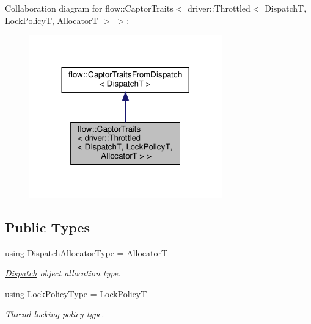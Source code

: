 Collaboration diagram for flow\+:\+:Captor\+Traits$<$ driver\+:\+:Throttled$<$ DispatchT, Lock\+PolicyT, AllocatorT $>$ $>$\+:\nopagebreak
\begin{figure}[H]
\begin{center}
\leavevmode
\includegraphics[width=236pt]{structflow_1_1_captor_traits_3_01driver_1_1_throttled_3_01_dispatch_t_00_01_lock_policy_t_00_01_7745efc83cc27493d3a1201a90d33e8a}
\end{center}
\end{figure}
\subsection*{Public Types}
\begin{DoxyCompactItemize}
\item 
\mbox{\label{structflow_1_1_captor_traits_3_01driver_1_1_throttled_3_01_dispatch_t_00_01_lock_policy_t_00_01_allocator_t_01_4_01_4_a8c02d0a99c8c592f1fbad42a32d3f508}} 
using \hyperlink{structflow_1_1_captor_traits_3_01driver_1_1_throttled_3_01_dispatch_t_00_01_lock_policy_t_00_01_allocator_t_01_4_01_4_a8c02d0a99c8c592f1fbad42a32d3f508}{Dispatch\+Allocator\+Type} = AllocatorT
\begin{DoxyCompactList}\small\item\em \hyperlink{classflow_1_1_dispatch}{Dispatch} object allocation type. \end{DoxyCompactList}\item 
\mbox{\label{structflow_1_1_captor_traits_3_01driver_1_1_throttled_3_01_dispatch_t_00_01_lock_policy_t_00_01_allocator_t_01_4_01_4_aa884050e0d74e3069989fdd06198cd62}} 
using \hyperlink{structflow_1_1_captor_traits_3_01driver_1_1_throttled_3_01_dispatch_t_00_01_lock_policy_t_00_01_allocator_t_01_4_01_4_aa884050e0d74e3069989fdd06198cd62}{Lock\+Policy\+Type} = Lock\+PolicyT
\begin{DoxyCompactList}\small\item\em Thread locking policy type. \end{DoxyCompactList}\end{DoxyCompactItemize}


